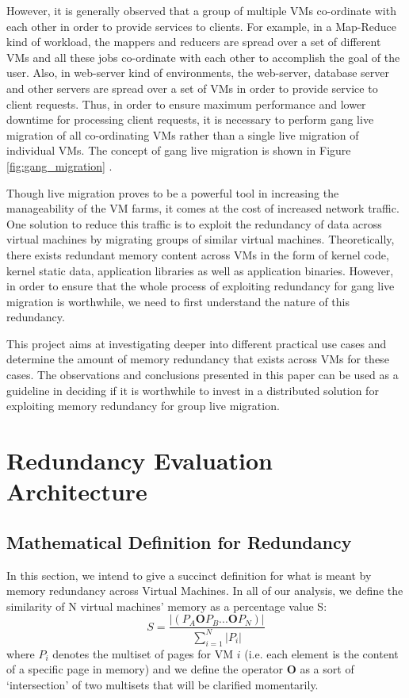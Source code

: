 \documentclass{acm_proc_article-sp}
\begin{document}
However, it is generally observed that a group of multiple VMs co-ordinate with each other in order to provide services to clients. For example, in a Map-Reduce kind of workload, the mappers and reducers are spread over a set of different VMs and all these jobs co-ordinate with each other to accomplish the goal of the user. Also, in web-server kind of environments, the web-server, database server and other servers are spread over a set of VMs in order to provide service to client requests. Thus, in order to ensure maximum performance and lower downtime for processing client requests, it is necessary to perform gang live migration of all co-ordinating VMs rather than a single live migration of individual VMs. The concept of gang live migration is shown in Figure \ref{fig:gang_migration} \cite{live_gang}.
\par
Though live migration proves to be a powerful tool in increasing the manageability of the VM farms, it comes at the cost of increased network traffic. One solution to reduce this traffic is to exploit the redundancy of data across virtual machines by migrating groups of similar virtual machines. Theoretically, there exists redundant memory content across VMs in the form of kernel code, kernel static data, application libraries as well as application binaries. However, in order to ensure that the whole process of exploiting redundancy for gang live migration is worthwhile, we need to first understand the nature of this redundancy.
\par
This project aims at investigating deeper into different practical use cases and determine the amount of memory redundancy that exists across VMs for these cases. The observations and conclusions presented in this paper can be used as a guideline in deciding if it is worthwhile to invest in a distributed solution for exploiting memory redundancy for group live migration.
\par

\section{Redundancy Evaluation Architecture}\label{sec:redundancy}

\subsection{Mathematical Definition for Redundancy}\label{sec:red_math}
In this section, we intend to give a succinct definition for what is meant by memory redundancy across Virtual Machines.  In all of our analysis, we define the similarity of N virtual machines' memory as a percentage value S:
\begin{equation}
S = \frac{|(P_A \mathbf{O} P_B ... \mathbf{O} P_N)|}{\sum\limits_{i=1}^{N}|P_i|}
\end{equation}\label{eqn:s}
where $P_i$ denotes the multiset of pages for VM $i$ (i.e. each element is the content of a specific page in memory) and we define the operator $\mathbf{O}$ as a sort of `intersection' of two multisets that will be clarified momentarily.  
\end{document}
